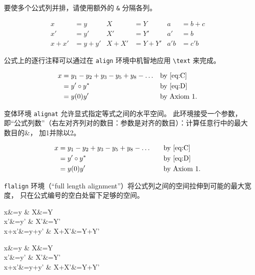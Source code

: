 要使多个公式列并排，请使用额外的 \verb|&| 分隔各列。
\begin{tcblisting}{}
\begin{align}
x&=y          & X&=Y         & a&=b+c\label{eq:C}\\
x'&=y'        & X'&=Y'       & a'&=b\label{eq:D}\\
x+x'&=y+y'    & X+X'&=Y+Y'   & a'b&=c'b
\end{align}
\end{tcblisting}

公式上的逐行注释可以通过在 \verb|align| 环境中机智地应用 \verb|\text| 来完成。
\begin{tcblisting}{}
\begin{align}
x& = y_1-y_2+y_3-y_5+y_8-\dots
                     && \text{by \eqref{eq:C}}\\
 & = y'\circ y^*     && \text{by \eqref{eq:D}}\\
 & = y(0) y'         && \text {by Axiom 1.}
\end{align}
\end{tcblisting}

变体环境 \verb|alignat| 允许显式指定等式之间的水平空间。 此环境接受一个参数，  即“公式列数”（右左对齐列对的数目：参数是对齐的数目）：计算任意行中的最大数目的\&，  加1并除以2。
\begin{tcblisting}{}
\begin{alignat}{2}
x& = y_1-y_2+y_3-y_5+y_8-\dots
                     &\quad& \text{by \eqref{eq:C}}\\
 & = y'\circ y^*     && \text{by \eqref{eq:D}}\\
 & = y(0) y'         && \text {by Axiom 1.}
\end{alignat}
\end{tcblisting}

\verb|flalign| 环境（“full length alignment”）将公式列之间的空间拉伸到可能的最大宽度，  只在公式编号的空白处留下足够的空间。
\begin{tcblisting}{}
\begin{flalign}
x&=y                & X&=Y\\
x'&=y'              & X'&=Y'\\
x+x'&=y+y'          & X+X'&=Y+Y'
\end{flalign}
\end{tcblisting}

\begin{tcblisting}{}
  \begin{flalign*}
x&=y                & X&=Y\\
x'&=y'              & X'&=Y'\\
x+x'&=y+y'          & X+X'&=Y+Y'
\end{flalign*}
\end{tcblisting}

